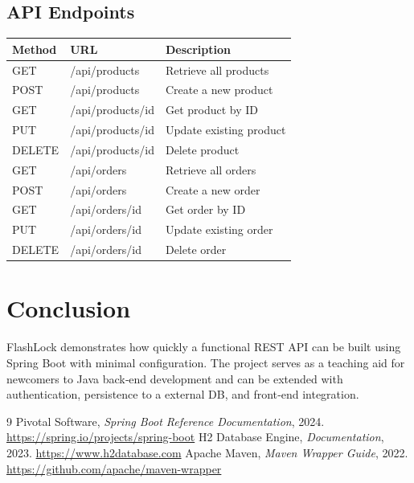 \documentclass[12pt,a4paper]{report}
\begin{document}
\section{API Endpoints}\label{sec:api}
\begin{tabular}{p{3cm} p{5cm} p{5cm}}
    \toprule
    Method & URL & Description \\
    \midrule
    GET & /api/products & Retrieve all products \\
    POST & /api/products & Create a new product \\
    GET & /api/products/{id} & Get product by ID \\
    PUT & /api/products/{id} & Update existing product \\
    DELETE & /api/products/{id} & Delete product \\
    GET & /api/orders & Retrieve all orders \\
    POST & /api/orders & Create a new order \\
    GET & /api/orders/{id} & Get order by ID \\
    PUT & /api/orders/{id} & Update existing order \\
    DELETE & /api/orders/{id} & Delete order \\
    \bottomrule
\end{tabular}

\chapter{Conclusion}
FlashLock demonstrates how quickly a functional REST API can be built using Spring Boot with minimal configuration. The project serves as a teaching aid for newcomers to Java back‑end development and can be extended with authentication, persistence to a external DB, and front‑end integration.

\begin{thebibliography}{9}
    Pivotal Software, \textit{Spring Boot Reference Documentation}, 2024. \url{https://spring.io/projects/spring-boot}
    H2 Database Engine, \textit{Documentation}, 2023. \url{https://www.h2database.com}
    Apache Maven, \textit{Maven Wrapper Guide}, 2022. \url{https://github.com/apache/maven-wrapper}
\end{thebibliography}
\end{document}
